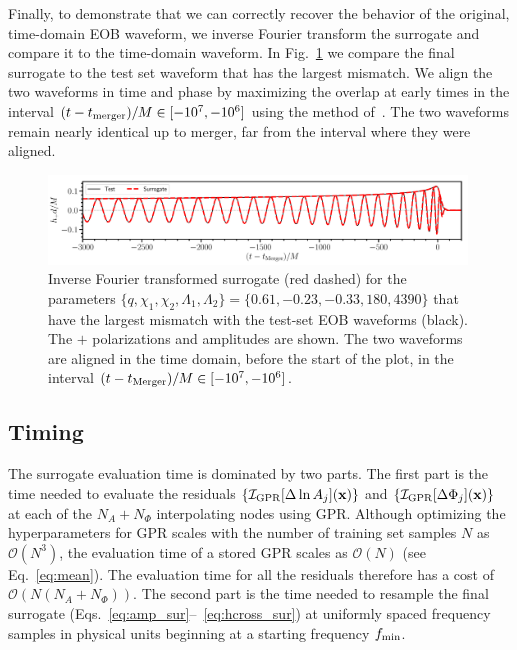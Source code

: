 \documentclass[prd,aps,letter,twocolumn,floatfix,notitlepage,nofootinbib]{revtex4-1}
\def\bx{\mathbf{x}}
\begin{document}
Finally, to demonstrate that we can correctly recover the behavior of the original, time-domain EOB waveform, we inverse Fourier transform the surrogate and compare it to the time-domain waveform. In Fig.~\ref{fig:maxmismatchtd} we compare the final surrogate to the test set waveform that has the largest mismatch. We align the two waveforms in time and phase by maximizing the overlap at early times in the interval $(t-t_{\rm merger})/M \in [-10^7, -10^6]$ using the method of~\cite{ReadMarkakisShibata2009}. The two waveforms remain nearly identical up to merger, far from the interval where they were aligned.

\begin{figure}[htb]
\centering
\includegraphics[width=0.99\textwidth]{hmaxerror.pdf}
\caption{Inverse Fourier transformed surrogate (red dashed) for the parameters $\{q, \chi_1, \chi_2, \Lambda_1, \Lambda_2\} = \{0.61, -0.23, -0.33, 180, 4390\}$ that have the largest mismatch with the test-set EOB waveforms (black). The $+$ polarizations and amplitudes are shown. The two waveforms are aligned in the time domain, before the start of the plot, in the interval $(t-t_{\rm Merger})/M \in [-10^7, -10^6]$.}
\label{fig:maxmismatchtd}
\end{figure}


\subsection{Timing}

The surrogate evaluation time is dominated by two parts. The first part is the time needed to evaluate the residuals $\{\mathcal{I}_{\rm GPR}[\Delta\ln A_j](\bx)\}$ and $\{\mathcal{I}_{\rm GPR}[\Delta\Phi_j](\bx)\}$ at each of the $N_A+N_\Phi$ interpolating nodes using GPR. Although optimizing the hyperparameters for GPR scales with the number of training set samples $N$ as $\mathcal{O}(N^3)$, the evaluation time of a stored GPR scales as $\mathcal{O}(N)$ (see Eq.~\eqref{eq:mean}). The evaluation time for all the residuals therefore has a cost of $\mathcal{O}(N(N_A+N_\Phi))$. The second part is the time needed to resample the final surrogate (Eqs.~\eqref{eq:amp_sur}--~\eqref{eq:hcross_sur}) at uniformly spaced frequency samples in physical units beginning at a starting frequency $f_{\rm min}$. 
\end{document}
